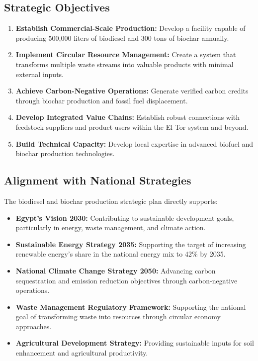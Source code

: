 \subsection{Strategic Objectives}

\begin{enumerate}
    \item \textbf{Establish Commercial-Scale Production:} Develop a facility capable of producing 500,000 liters of biodiesel and 300 tons of biochar annually.
    
    \item \textbf{Implement Circular Resource Management:} Create a system that transforms multiple waste streams into valuable products with minimal external inputs.
    
    \item \textbf{Achieve Carbon-Negative Operations:} Generate verified carbon credits through biochar production and fossil fuel displacement.
    
    \item \textbf{Develop Integrated Value Chains:} Establish robust connections with feedstock suppliers and product users within the El Tor system and beyond.
    
    \item \textbf{Build Technical Capacity:} Develop local expertise in advanced biofuel and biochar production technologies.
\end{enumerate}

\subsection{Alignment with National Strategies}

The biodiesel and biochar production strategic plan directly supports:

\begin{itemize}
    \item \textbf{Egypt's Vision 2030:} Contributing to sustainable development goals, particularly in energy, waste management, and climate action.
    
    \item \textbf{Sustainable Energy Strategy 2035:} Supporting the target of increasing renewable energy's share in the national energy mix to 42\% by 2035.
    
    \item \textbf{National Climate Change Strategy 2050:} Advancing carbon sequestration and emission reduction objectives through carbon-negative operations.
    
    \item \textbf{Waste Management Regulatory Framework:} Supporting the national goal of transforming waste into resources through circular economy approaches.
    
    \item \textbf{Agricultural Development Strategy:} Providing sustainable inputs for soil enhancement and agricultural productivity.
\end{itemize}

